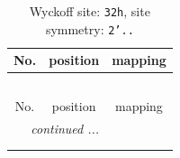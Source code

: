 \documentclass[fleqn,8pt]{jsarticle}
\begin{document}
\renewcommand{\arraystretch}{1.2}
\begin{longtable}{ccc}
\caption{Wyckoff site: {\tt 32h}, site symmetry: {\tt 2'..}}
 \\
 \hline \hline
No. & position & mapping \\ \hline \endfirsthead

\multicolumn{2}{l}{\tablename\ \thetable{}} \\
 \hline \hline
No. & position & mapping \\ \hline \endhead

 \hline \hline
\multicolumn{2}{r}{\footnotesize\it continued ...} \\ \endfoot

 \hline \hline
\multicolumn{2}{r}{} \\ \endlastfoot


\end{longtable}
\end{document}
